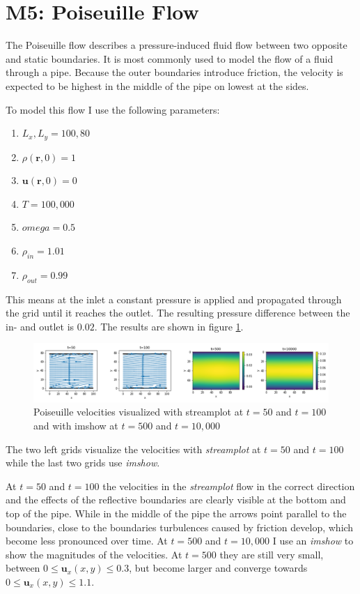 \documentclass[a4paper,11pt, oneside]{book}
\begin{document}
\section{M5: Poiseuille Flow}
The Poiseuille flow describes a pressure-induced fluid flow between two opposite and static boundaries. 
It is most commonly used to model the flow of a fluid through a pipe. 
Because the outer boundaries introduce friction, the velocity is expected to be highest in the middle of the pipe on lowest at the sides.

To model this flow I use the following parameters:
\begin{enumerate}
    \item $L_{x}, L_{y} = 100, 80$
    \item $\rho(\textbf{r}, 0) = 1$
    \item $\textbf{u}(\textbf{r}, 0) = 0$
    \item $T = 100,000$
    \item $omega = 0.5$
    \item $\rho_{in} = 1.01$
    \item $\rho_{out} = 0.99$
\end{enumerate}
This means at the inlet a constant pressure is applied and propagated through the grid until it reaches the outlet. The resulting pressure difference between the in- and outlet is $0.02$. 
The results are shown in figure \ref{fig:m5-1-vel-time}.
\begin{figure}[ht]
\centering
\includegraphics[width=\columnwidth]{milestones/final/img/m5-1-vel-time.png}
\vspace*{-4mm}
\caption[Poiseuille Velocities]{Poiseuille velocities visualized with streamplot at $t=50$ and $t=100$ and with imshow at $t=500$ and $t=10,000$ }
\label{fig:m5-1-vel-time}
\end{figure}
The two left grids visualize the velocities with \textit{streamplot} at $t=50$ and $t=100$ while the last two grids use \textit{imshow}. 

At $t=50$ and $t=100$ the velocities in the \textit{streamplot} flow in the correct direction and the effects of the reflective boundaries are clearly visible at the bottom and top of the pipe. While in the middle of the pipe the arrows point parallel to the boundaries, close to the boundaries turbulences caused by friction develop, which become less pronounced over time.
At $t=500$ and $t=10,000$ I use an \textit{imshow} to show the magnitudes of the velocities.
At $t=500$ they are still very small, between $0\leq\textbf{u}_{x}(x,y)\leq0.3$, but become larger and converge towards $0\leq\textbf{u}_{x}(x,y)\leq1.1$.
\end{document}
